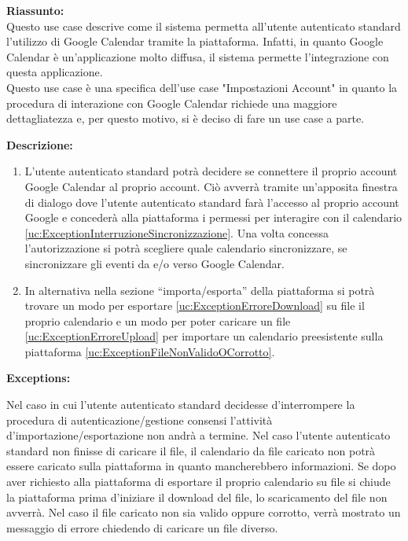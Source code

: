 \begin{listaPersonale}[UC]{}
\begin{listaPersonale2}[UC] {}
        \textbf{Riassunto:} \\
        Questo use case descrive come il sistema permetta all'utente autenticato standard l'utilizzo di Google Calendar tramite la piattaforma. Infatti, in quanto Google Calendar è un'applicazione molto diffusa, il sistema permette l'integrazione con questa applicazione. \\ 
        Questo use case è una specifica dell'use case "Impostazioni Account" in quanto la procedura di interazione con Google Calendar richiede una maggiore dettagliatezza e, per questo motivo, si è deciso di fare un use case a parte.
        

        \textbf{Descrizione:}
        \begin{enumerate}
            \item L'utente autenticato standard potrà decidere se connettere il proprio account Google Calendar al proprio account. Ciò avverrà tramite un'apposita finestra di dialogo dove l'utente autenticato standard farà l'accesso al proprio account Google e concederà alla piattaforma i permessi per interagire con il calendario \ref{uc:ExceptionInterruzioneSincronizzazione}. Una volta concessa l'autorizzazione si potrà scegliere quale calendario sincronizzare, se sincronizzare gli eventi da e/o verso Google Calendar.
            \item In alternativa nella sezione “importa/esporta” della piattaforma si potrà trovare un modo per esportare \ref{uc:ExceptionErroreDownload} su file il proprio calendario e un modo per poter caricare un file \ref{uc:ExceptionErroreUpload} per importare un calendario preesistente sulla piattaforma \ref{uc:ExceptionFileNonValidoOCorrotto}.
        \end{enumerate}

        \textbf{Exceptions:}
        \begin{enumerate}[label=\textbf{[exception \arabic{enumiii}]}, ref= \textbf{[exception \arabic{enumiii}]}]
             Nel caso in cui l'utente autenticato standard decidesse d'interrompere la procedura di autenticazione/gestione consensi l'attività d'importazione/esportazione non andrà a termine.
             Nel caso l'utente autenticato standard non finisse di caricare il file, il calendario da file caricato non potrà essere caricato sulla piattaforma in quanto mancherebbero informazioni.
             Se dopo aver richiesto alla piattaforma di esportare il proprio calendario su file si chiude la piattaforma prima d'iniziare il download del file, lo scaricamento del file non avverrà.
             Nel caso il file caricato non sia valido oppure corrotto, verrà mostrato un messaggio di errore chiedendo di caricare un file diverso.
        \end{enumerate}


\end{listaPersonale2}
\end{listaPersonale}
